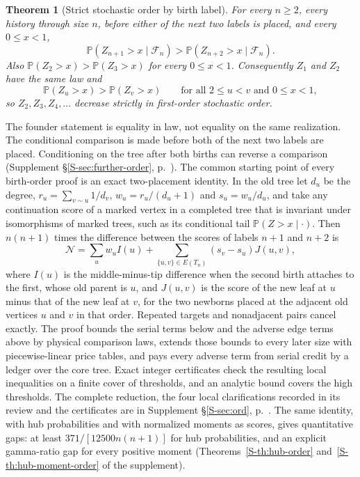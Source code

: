\documentclass[11pt]{article}
\newtheorem{theorem}{Theorem}
\newcommand{\resulttag}{?}
\newcommand{\tagnext}[1]{\renewcommand{\resulttag}{#1}}
\theoremstyle{remark}
\newcommand{\Prob}{\mathbb P}
\newcommand{\Sref}[1]{Supplement \S\ref{S-#1}, p.~\pageref{S-#1}}
\begin{document}
\tagnext{ORD}
\begin{theorem}[Strict stochastic order by birth label]\label{th:stoch-order}
For every $n\ge2$, every history through size $n$, before either of the next two labels is placed, and every $0\le x<1$,
\[
 \Prob(Z_{n+1}>x\mid\mathcal F_n)>\Prob(Z_{n+2}>x\mid\mathcal F_n).
\]
Also $\Prob(Z_2>x)>\Prob(Z_3>x)$ for every $0\le x<1$. Consequently $Z_1$ and $Z_2$ have the same law and
\[
 \Prob(Z_u>x)>\Prob(Z_v>x)\qquad\text{for all }2\le u<v\text{ and }0\le x<1,
\]
so $Z_2,Z_3,Z_4,\ldots$ decrease strictly in first-order stochastic order.
\end{theorem}
The founder statement is equality in law, not equality on the same realization. The conditional comparison is made before both of the next two labels are placed. Conditioning on the tree after both births can reverse a comparison (\Sref{sec:further-order}). The common starting point of every birth-order proof is an exact two-placement identity. In the old tree let $d_u$ be the degree, $r_u=\sum_{v\sim u}1/d_v$, $w_u=r_u/(d_u+1)$ and $s_u=w_u/d_u$, and take any continuation score of a marked vertex in a completed tree that is invariant under isomorphisms of marked trees, such as its conditional tail $\Prob(Z>x\mid\cdot)$. Then $n(n+1)$ times the difference between the scores of labels $n+1$ and $n+2$ is
\begin{equation}\label{eq:hub-signed}
 \mathcal N=\sum_u w_u I(u)+\sum_{\{u,v\}\in E(T_n)}(s_v-s_u)J(u,v),
\end{equation}
where $I(u)$ is the middle-minus-tip difference when the second birth attaches to the first, whose old parent is $u$, and $J(u,v)$ is the score of the new leaf at $u$ minus that of the new leaf at $v$, for the two newborns placed at the adjacent old vertices $u$ and $v$ in that order. Repeated targets and nonadjacent pairs cancel exactly. The proof bounds the serial terms below and the adverse edge terms above by physical comparison laws, extends those bounds to every later size with piecewise-linear price tables, and pays every adverse term from serial credit by a ledger over the core tree. Exact integer certificates check the resulting local inequalities on a finite cover of thresholds, and an analytic bound covers the high thresholds. The complete reduction, the four local clarifications recorded in its review and the certificates are in \Sref{sec:ord}. The same identity, with hub probabilities and with normalized moments as scores, gives quantitative gaps: at least $371/[12500n(n+1)]$ for hub probabilities, and an explicit gamma-ratio gap for every positive moment (Theorems~\ref{S-th:hub-order} and~\ref{S-th:hub-moment-order} of the supplement).
\end{document}

